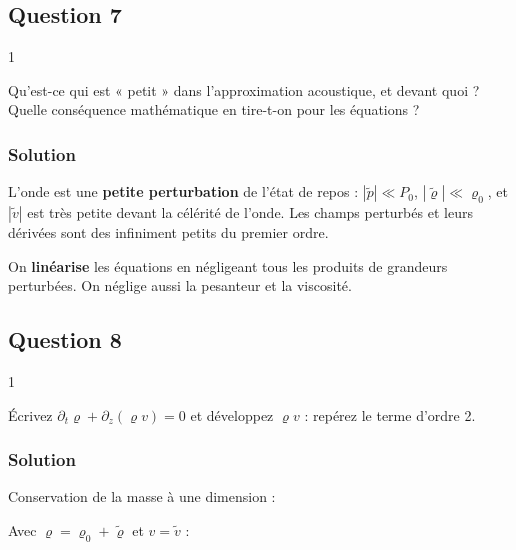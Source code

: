 \documentclass[11pt,a4paper]{article}
\newcommand{\equationajustee}[1]{%
  \sbox{\boiteequation}{$\displaystyle #1$}%
  \ifdim\wd\boiteequation>\linewidth
    \[\resizebox{\linewidth}{!}{\usebox{\boiteequation}}\]%
  \else
    \[#1\]%
  \fi}
\begin{document}
\hypertarget{question-7}{%
\subsection{Question 7}\label{question-7}}

\begin{indication}{1}

Qu'est-ce qui est « petit » dans l'approximation acoustique, et devant quoi ? Quelle conséquence mathématique en tire-t-on pour les équations ?

\end{indication}

\hypertarget{solution-6}{%
\subsubsection{Solution}\label{solution-6}}

L'onde est une \textbf{petite perturbation} de l'état de repos : \(|\tilde p|\ll P_0\), \(|\tilde\varrho|\ll\varrho_0\), et \(|\tilde v|\) est très petite devant la célérité de l'onde. Les champs perturbés et leurs dérivées sont des infiniment petits du premier ordre.

On \textbf{linéarise} les équations en négligeant tous les produits de grandeurs perturbées. On néglige aussi la pesanteur et la viscosité.

\hypertarget{question-8}{%
\subsection{Question 8}\label{question-8}}

\begin{indication}{1}

Écrivez \(\partial_t\varrho+\partial_z(\varrho v)=0\) et développez \(\varrho v\) : repérez le terme d'ordre 2.

\end{indication}

\hypertarget{solution-7}{%
\subsubsection{Solution}\label{solution-7}}

Conservation de la masse à une dimension :

\equationajustee{\frac{\partial\varrho}{\partial t}+\frac{\partial(\varrho v)}{\partial z}=0.}

Avec \(\varrho=\varrho_0+\tilde\varrho\) et \(v=\tilde v\) :
\end{document}
